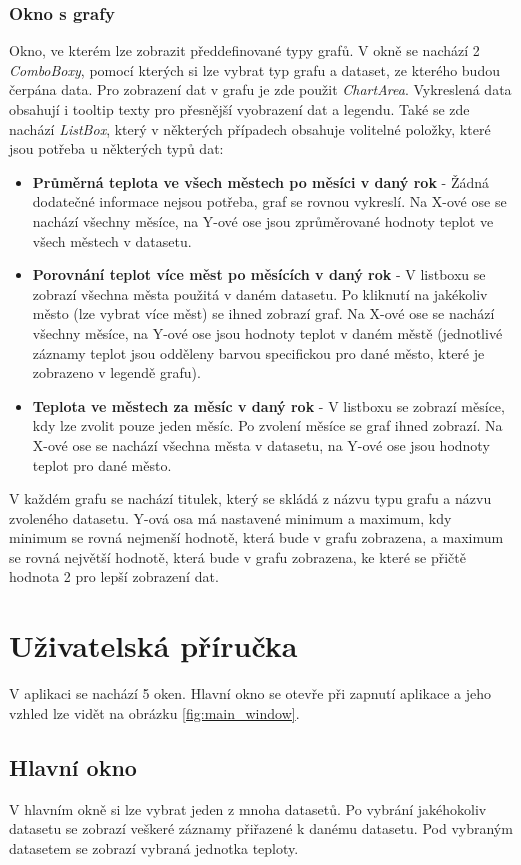 \documentclass[12pt, a4paper]{article}
\begin{document}
\subsubsection{Okno s grafy}
Okno, ve kterém lze zobrazit předdefinované typy grafů. V okně se nachází 2 \textit{ComboBoxy}, pomocí kterých si lze vybrat typ grafu a dataset, ze kterého budou čerpána data. Pro zobrazení dat v grafu je zde použit \textit{ChartArea}. Vykreslená data obsahují i tooltip texty pro přesnější vyobrazení dat a legendu. Také se zde nachází \textit{ListBox}, který v některých případech obsahuje volitelné položky, které jsou potřeba u některých typů dat:
\begin{itemize}
\item \textbf{Průměrná teplota ve všech městech po měsíci v daný rok} - Žádná dodatečné informace nejsou potřeba, graf se rovnou vykreslí. Na X-ové ose se nachází všechny měsíce, na Y-ové ose jsou zprůměrované hodnoty teplot ve všech městech v datasetu. 
\item \textbf{Porovnání teplot více měst po měsících v daný rok} - V listboxu se zobrazí všechna města použitá v daném datasetu. Po kliknutí na jakékoliv město (lze vybrat více měst) se ihned zobrazí graf. Na X-ové ose se nachází všechny měsíce, na Y-ové ose jsou hodnoty teplot v daném městě (jednotlivé záznamy teplot  jsou odděleny barvou specifickou pro dané město, které je zobrazeno v legendě grafu).
\item \textbf{Teplota ve městech za měsíc v daný rok} - V listboxu se zobrazí měsíce, kdy lze zvolit pouze jeden měsíc. Po zvolení měsíce se graf ihned zobrazí. Na X-ové ose se nachází všechna města v datasetu, na Y-ové ose jsou hodnoty teplot pro dané město.
\end{itemize}

V každém grafu se nachází titulek, který se skládá z názvu typu grafu a názvu zvoleného datasetu. Y-ová osa má nastavené minimum a maximum, kdy minimum se rovná nejmenší hodnotě, která bude v grafu zobrazena, a maximum se rovná největší hodnotě, která bude v grafu zobrazena, ke které se přičtě hodnota 2 pro lepší zobrazení dat.

\newpage
\section{Uživatelská příručka}
V aplikaci se nachází 5 oken. Hlavní okno se otevře při zapnutí aplikace a jeho vzhled lze vidět na obrázku \ref{fig:main_window}. 

\subsection{Hlavní okno}
V hlavním okně si lze vybrat jeden z mnoha datasetů. Po vybrání jakéhokoliv datasetu se zobrazí veškeré záznamy přiřazené k danému datasetu. Pod vybraným datasetem se zobrazí vybraná jednotka teploty.
\end{document}
